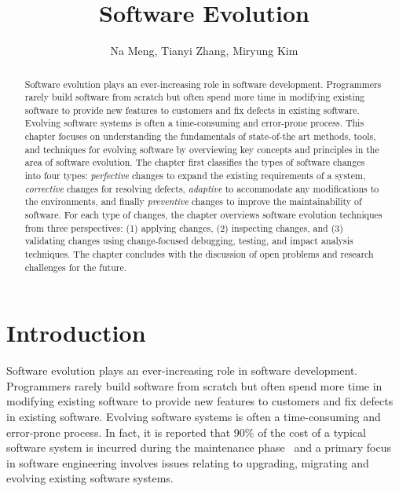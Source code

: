 \documentclass[runningheads,a4paper]{llncs}
\begin{document}
\mainmatter  %

\title{Software Evolution} 


%
%
\author{Na Meng, Tianyi Zhang, Miryung Kim} 



\maketitle


\begin{abstract}
	Software evolution plays an ever-increasing role in software development. Programmers rarely build software from scratch but often spend more time in modifying existing software to provide new features to customers and fix defects in existing software. Evolving software systems is often a time-consuming and error-prone process. This chapter focuses on understanding the fundamentals of state-of-the art methods, tools, and techniques for evolving software by overviewing key concepts and principles in the area of software evolution. 
	The chapter first classifies the types of software changes into four types: {\em perfective} changes to expand the existing requirements of a system, {\em corrective} changes for resolving defects, {\em adaptive} to accommodate any modifications to the environments, and finally {\em preventive} changes to improve the maintainability of software. For each type of changes, the chapter overviews software evolution techniques from three perspectives: (1) applying changes, (2) inspecting changes, and (3) validating changes using change-focused debugging, testing, and impact analysis techniques. The chapter concludes with the discussion of open problems and research challenges for the future. 
\end{abstract}

\section{Introduction}
Software evolution plays an ever-increasing role in software development. Programmers rarely build software from scratch but often spend more time in modifying existing software to provide new features to customers and fix defects in existing software.  Evolving software systems is often a time-consuming and error-prone process. In fact, it is reported that 90\% of the cost of a typical software system is incurred during the maintenance phase~\cite{Madhavji2006:evolution} and a primary focus in software engineering involves issues relating to upgrading, migrating and evolving existing software systems. 
\end{document}
